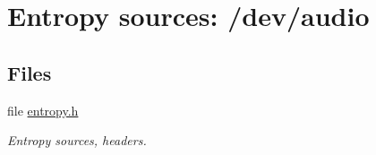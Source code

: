 \hypertarget{group__ES__audio__m}{
\section{Entropy sources: /dev/audio}
\label{group__ES__audio__m}
}
\subsection*{Files}
\begin{CompactItemize}
\item 
file \hyperlink{entropy_8h}{entropy.h}
\begin{CompactList}\small\item\em Entropy sources, headers. \item\end{CompactList}

\end{CompactItemize}
